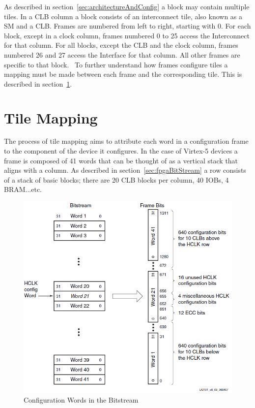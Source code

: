 As described in section~\ref{sec:architectureAndConfig} a block may contain multiple tiles.
In a \acrshort{CLB} column a block consists of an interconnect tile, also known as a \acrfull{SM} and a \acrshort{CLB}.
Frames are numbered from left to right, starting with 0. 
For each block, except in a clock column, frames numbered 0 to 25 access the Interconnect for that column. 
For all blocks, except the \acrshort{CLB} and the clock column, frames numbered 26 and 27 access the Interface for that column. 
All other frames are specific to that block.~\cite{virtex5ConfigGuide}
To further understand how frames configure tiles a mapping must be made between each frame and the corresponding tile.
This is described in section~\ref{sec:tileMapping}.

\section{Tile Mapping} \label{sec:tileMapping}
The process of tile mapping aims to attribute each word in a configuration frame to the component of the device it configures.
In the case of Virtex-5 devices a frame is composed of 41 words that can be thought of as a vertical stack that aligns with a column.
As described in section~\ref{sec:fpgaBitStream} a row consists of a stack of basic blocks; there are 20 \acrshort{CLB} blocks per column, 40 \acrshort{IOB}s, 4 \acrshort{BRAM}...etc.
\begin{figure}[h]
	\centering
	\includegraphics[width=0.9\linewidth]{Figures/frameTileMap}
	\caption[Configuration Words in the Bitstream~\cite{virtex5ConfigGuide}]{Configuration Words in the Bitstream~\cite{virtex5ConfigGuide}}
	\label{fig:frameTileMap}
\end{figure}
